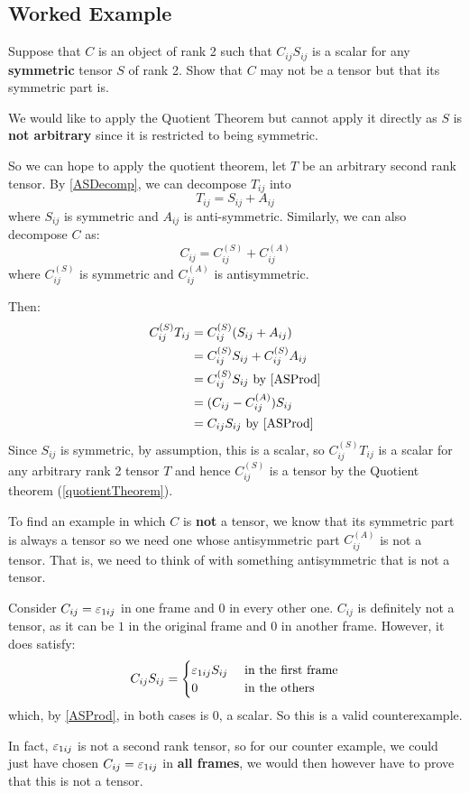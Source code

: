 \documentclass[../main.tex]{subfiles}
\begin{document}
\subsection{Worked Example}
\begin{remark}[Question]
  Suppose that $C$ is an object of rank 2 such that $C_{i j}S_{i j}$ is a scalar for any \textbf{symmetric} tensor $S$ of rank 2.
  Show that $C$ may not be a tensor but that its symmetric part is.
\end{remark}
We would like to apply the Quotient Theorem but cannot apply it directly as $S$ is \textbf{not arbitrary} since it is restricted to being symmetric.

So we can hope to apply the quotient theorem, let $T$ be an arbitrary second rank tensor.
By \cref{ASDecomp}, we can decompose $T_{i j}$ into
\[
  T_{i j} = S_{i j} + A_{i j}
\]
where $S_{i j}$ is symmetric and $A_{i j}$ is anti-symmetric.
Similarly, we can also decompose $C$ as:
\[
  C_{i j} = C^{(S)}_{i j} + C^{(A)}_{i j}
\]
where $C^{(S)}_{i j}$ is symmetric and $C^{(A)}_{i j}$ is antisymmetric.

Then:
\begin{align*}
  C^{(S)}_{i j} T_{i j} &= C^{(S)}_{i j}(S_{i j} + A_{i j}) \\
                        &= C^{(S)}_{i j}S_{i j} + C^{(S)}_{i j}A_{i j} \\
                        &= C^{(S)}_{i j}S_{i j} \text{ by \cref{ASProd}} \\
                        &= (C_{i j} - C^{(A)}_{i j})S_{i j} \\
                        &= C_{i j}S_{i j} \text{ by \cref{ASProd}}
\end{align*}
Since $S_{i j}$ is symmetric, by assumption, this is a scalar, so $C^{(S)}_{i j}T_{i j}$ is a scalar for any arbitrary rank 2 tensor $T$ and hence $C^{(S)}_{i j}$ is a tensor by the Quotient theorem (\cref{quotientTheorem}).

To find an example in which $C$ is \textbf{not} a tensor, we know that its symmetric part is always a tensor so we need one whose antisymmetric part $C^{(A)}_{i j}$ is not a tensor.
That is, we need to think of with something antisymmetric that is not a tensor.

Consider $C_{i j} = \varepsilon_{1 i j}$ in one frame and $0$ in every other one.
$C_{i j}$ is definitely not a tensor, as it can be $1$ in the original frame and $0$ in another frame.
However, it does satisfy:
\[
  C_{i j}S_{i j} = \begin{cases}
  \varepsilon_{1 i j}S_{i j} & \text{ in the first frame} \\
  0 & \text{ in the others}
  \end{cases}
\]
which, by \cref{ASProd}, in both cases is 0, a scalar.
So this is a valid counterexample.
\begin{remark}
  \nonexaminable
  In fact, $\varepsilon_{1 i j}$ is not a second rank tensor, so for our counter example, we could just have chosen $C_{i j} = \varepsilon_{1 i j}$ in \textbf{all frames}, we would then however have to prove that this is not a tensor.
\end{remark}
\end{document}
